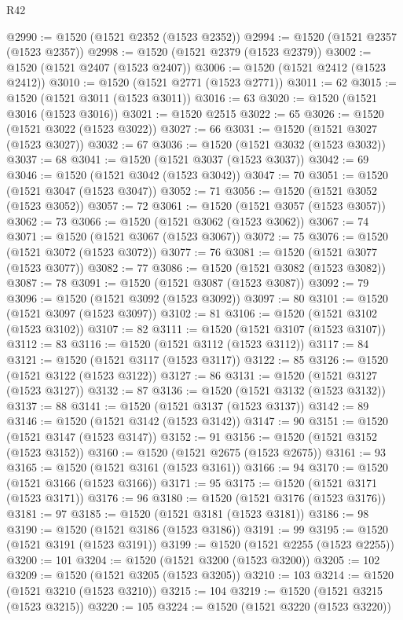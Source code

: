 \begin{lexlean}{R42}
\begin{coremodule}
{@2990 := @1520 (@1521 @2352 (@1523 @2352))
@2994 := @1520 (@1521 @2357 (@1523 @2357))
@2998 := @1520 (@1521 @2379 (@1523 @2379))
@3002 := @1520 (@1521 @2407 (@1523 @2407))
@3006 := @1520 (@1521 @2412 (@1523 @2412))
@3010 := @1520 (@1521 @2771 (@1523 @2771))
@3011 := 62
@3015 := @1520 (@1521 @3011 (@1523 @3011))
@3016 := 63
@3020 := @1520 (@1521 @3016 (@1523 @3016))
@3021 := @1520 @2515
@3022 := 65
@3026 := @1520 (@1521 @3022 (@1523 @3022))
@3027 := 66
@3031 := @1520 (@1521 @3027 (@1523 @3027))
@3032 := 67
@3036 := @1520 (@1521 @3032 (@1523 @3032))
@3037 := 68
@3041 := @1520 (@1521 @3037 (@1523 @3037))
@3042 := 69
@3046 := @1520 (@1521 @3042 (@1523 @3042))
@3047 := 70
@3051 := @1520 (@1521 @3047 (@1523 @3047))
@3052 := 71
@3056 := @1520 (@1521 @3052 (@1523 @3052))
@3057 := 72
@3061 := @1520 (@1521 @3057 (@1523 @3057))
@3062 := 73
@3066 := @1520 (@1521 @3062 (@1523 @3062))
@3067 := 74
@3071 := @1520 (@1521 @3067 (@1523 @3067))
@3072 := 75
@3076 := @1520 (@1521 @3072 (@1523 @3072))
@3077 := 76
@3081 := @1520 (@1521 @3077 (@1523 @3077))
@3082 := 77
@3086 := @1520 (@1521 @3082 (@1523 @3082))
@3087 := 78
@3091 := @1520 (@1521 @3087 (@1523 @3087))
@3092 := 79
@3096 := @1520 (@1521 @3092 (@1523 @3092))
@3097 := 80
@3101 := @1520 (@1521 @3097 (@1523 @3097))
@3102 := 81
@3106 := @1520 (@1521 @3102 (@1523 @3102))
@3107 := 82
@3111 := @1520 (@1521 @3107 (@1523 @3107))
@3112 := 83
@3116 := @1520 (@1521 @3112 (@1523 @3112))
@3117 := 84
@3121 := @1520 (@1521 @3117 (@1523 @3117))
@3122 := 85
@3126 := @1520 (@1521 @3122 (@1523 @3122))
@3127 := 86
@3131 := @1520 (@1521 @3127 (@1523 @3127))
@3132 := 87
@3136 := @1520 (@1521 @3132 (@1523 @3132))
@3137 := 88
@3141 := @1520 (@1521 @3137 (@1523 @3137))
@3142 := 89
@3146 := @1520 (@1521 @3142 (@1523 @3142))
@3147 := 90
@3151 := @1520 (@1521 @3147 (@1523 @3147))
@3152 := 91
@3156 := @1520 (@1521 @3152 (@1523 @3152))
@3160 := @1520 (@1521 @2675 (@1523 @2675))
@3161 := 93
@3165 := @1520 (@1521 @3161 (@1523 @3161))
@3166 := 94
@3170 := @1520 (@1521 @3166 (@1523 @3166))
@3171 := 95
@3175 := @1520 (@1521 @3171 (@1523 @3171))
@3176 := 96
@3180 := @1520 (@1521 @3176 (@1523 @3176))
@3181 := 97
@3185 := @1520 (@1521 @3181 (@1523 @3181))
@3186 := 98
@3190 := @1520 (@1521 @3186 (@1523 @3186))
@3191 := 99
@3195 := @1520 (@1521 @3191 (@1523 @3191))
@3199 := @1520 (@1521 @2255 (@1523 @2255))
@3200 := 101
@3204 := @1520 (@1521 @3200 (@1523 @3200))
@3205 := 102
@3209 := @1520 (@1521 @3205 (@1523 @3205))
@3210 := 103
@3214 := @1520 (@1521 @3210 (@1523 @3210))
@3215 := 104
@3219 := @1520 (@1521 @3215 (@1523 @3215))
@3220 := 105
@3224 := @1520 (@1521 @3220 (@1523 @3220))
}
\end{coremodule}
\end{lexlean}
